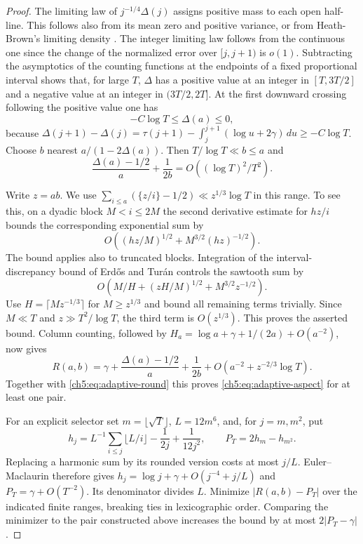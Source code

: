 \documentclass[11pt,a4paper,oneside,openany]{report}
\theoremstyle{remark}\newtheorem{remark}[theorem]{Remark}
\numberwithin{equation}{section}
\begin{document}
\begin{proof}
The limiting law of $j^{-1/4}\Delta(j)$ assigns positive mass to each open half-line. This follows also from its mean zero and positive variance, or from Heath-Brown's limiting density \cite{hb}. The integer limiting law follows from the continuous one since the change of the normalized error over $[j,j+1)$ is $o(1)$. Subtracting the asymptotics of the counting functions at the endpoints of a fixed proportional interval shows that, for large $T$, $\Delta$ has a positive value at an integer in $[T,3T/2]$ and a negative value at an integer in $(3T/2,2T]$. At the first downward crossing following the positive value one has
\[
 -C\log T\le\Delta(a)\le0,
\]
because $\Delta(j+1)-\Delta(j)=\tau(j+1)-\int_j^{j+1}(\log u+2\gamma)\,du\ge-C\log T$. Choose $b$ nearest $a/(1-2\Delta(a))$. Then $T/\log T\ll b\le a$ and
\begin{equation}\label{ch5:eq:adaptive-round}
 \frac{\Delta(a)-1/2}{a}+\frac{1}{2b}=O((\log T)^2/T^2).
\end{equation}

Write $z=ab$. We use $\sum_{i\le a}(\{z/i\}-1/2)\ll z^{1/3}\log T$ in this range. To see this, on a dyadic block $M<i\le 2M$ the second derivative estimate for $h z/i$ bounds the corresponding exponential sum by
\[
 O\left((hz/M)^{1/2}+M^{3/2}(hz)^{-1/2}\right).
\]
The bound applies also to truncated blocks. Integration of the interval-discrepancy bound of Erd\H{o}s and Tur\'an controls the sawtooth sum by
\[
 O\left(M/H+(zH/M)^{1/2}+M^{3/2}z^{-1/2}\right).
\]
Use $H=\lceil Mz^{-1/3}\rceil$ for $M\ge z^{1/3}$ and bound all remaining terms trivially. Since $M\ll T$ and $z\gg T^2/\log T$, the third term is $O(z^{1/3})$. This proves the asserted bound. Column counting, followed by $H_a=\log a+\gamma+1/(2a)+O(a^{-2})$, now gives
\[
 R(a,b)=\gamma+\frac{\Delta(a)-1/2}{a}+\frac1{2b}
  +O\left(a^{-2}+z^{-2/3}\log T\right).
\]
Together with \eqref{ch5:eq:adaptive-round} this proves \eqref{ch5:eq:adaptive-aspect} for at least one pair.

For an explicit selector set $m=\lfloor\sqrt T\rfloor$, $L=12m^6$, and, for $j=m,m^2$, put
\[
 h_j=L^{-1}\sum_{i\le j}\lfloor L/i\rfloor-\frac{1}{2j}+\frac{1}{12j^2},\qquad P_T=2h_m-h_{m^2}.
\]
Replacing a harmonic sum by its rounded version costs at most $j/L$. Euler--Maclaurin therefore gives $h_j=\log j+\gamma+O(j^{-4}+j/L)$ and $P_T=\gamma+O(T^{-2})$. Its denominator divides $L$. Minimize $|R(a,b)-P_T|$ over the indicated finite ranges, breaking ties in lexicographic order. Comparing the minimizer to the pair constructed above increases the bound by at most $2|P_T-\gamma|$.
\end{proof}
\end{document}

